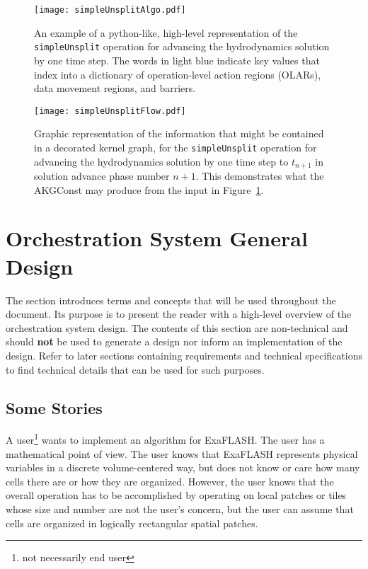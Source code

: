 \documentclass{article}
\newcommand{\FlashOfTheFuture}{ExaFLASH\xspace}
\newcommand{\shortOLARs} {OLARs\xspace}
\newcommand{\shortKGC}  {AKGConst\xspace}     %
\newcommand{\OLARs}  {\shortOLARs}             %
\newcommand{\KGC}       {\shortKGC}
\begin{document}
\begin{figure}[!hp]
\begin{center}
\texttt{[image: simpleUnsplitAlgo.pdf]}
\caption[]{An example of a python-like, high-level representation of the
\texttt{simpleUnsplit} operation for advancing the hydrodynamics solution by one
time step.  The words in light blue indicate key values that index into a
dictionary of operation-level action regions (\OLARs), data movement regions, and barriers.}
\label{fig:simpleUnsplitAlgo}
\end{center}
\end{figure}

\begin{figure}[!hp]
\begin{center}
\texttt{[image: simpleUnsplitFlow.pdf]}
\caption[]{Graphic representation of the information that might be contained in a decorated kernel graph,
for the
\texttt{simpleUnsplit} operation for advancing the hydrodynamics solution by one time step to $t_{n+1}$
in solution advance phase number $n+1$.
This demonstrates what the \KGC may produce from the input in Figure~\ref{fig:simpleUnsplitAlgo}.}
\label{fig:simpleUnsplitKernelGraph}
\end{center}
\end{figure}

\newpage
\section{Orchestration System General Design}
The section introduces terms and concepts that will be used throughout the
document.  Its purpose is to present the reader with a high-level overview of
the orchestration system design.  The contents of this section are non-technical
and should \textbf{not} be used to generate a design nor inform an
implementation of the design.  Refer to later sections containing requirements
and technical specifications to find technical details that can be used for such
purposes.\\

\subsection{Some Stories}
A user\footnote{not necessarily end user} wants to implement an algorithm for \FlashOfTheFuture.
The user has a mathematical point of view.
The user knows that \FlashOfTheFuture represents physical variables in
a discrete volume-centered way, but does not know or care how many cells
there are or how they are organized. However, the user knows that
the overall operation has to be accomplished by operating on
local patches or tiles whose size and number are not the user's
concern, but the user can assume that cells are organized
in logically rectangular spatial patches.\\
\end{document}
